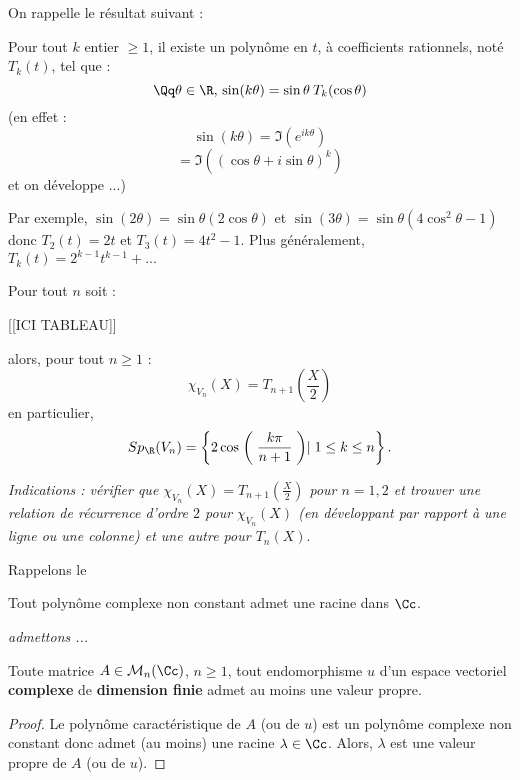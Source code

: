 \documentclass[class=report,crop=false]{standalone}
\newcommand{\Sp}{Sp}
\begin{document}
\begin{exercicecours}
On rappelle le résultat suivant :

Pour tout $k$ entier $\ge 1$, il existe un polynôme en $t$, à coefficients rationnels, noté $T_k(t)$, tel que :
\[\Qq \theta \in \R ,\, \sin (k\theta) = \sin \theta \:  T_k(\cos \theta)\]
(en effet : \[\sin (k\theta) = \Im (e^{ik\theta})\]
\[= \Im \left( (\cos \theta + i \sin \theta )^k \right)\]
et on développe ...)

Par exemple, $\sin (2 \theta) = \sin \theta (2 \cos \theta)$ et $\sin (3 \theta) = \sin \theta (4 \cos^2 \theta -1)$ donc $T_2(t) =2t$ et $T_3(t) = 4t^2-1$. Plus généralement, $T_k(t) = 2^{k-1}t^{k-1} + ...$

Pour tout $n$ soit :


[[ICI TABLEAU]]
%

alors, pour tout $n \ge 1$ :
\[\chi_{V_n}(X) = T_{n+1}(\frac{X}{2})\]
en particulier, \[\Sp_{\R}(V_n) = \left\{2\cos\biggm(\frac{k\pi}{n+1}\biggm) \mid 1 \le k \le n\right\} .\]

{\it Indications : vérifier que $\chi_{V_n}(X) = T_{n+1}(\frac{X}{2})$ pour $n=1,2$ et trouver une relation de récurrence d'ordre $2$ pour  $\chi_{V_n}(X)$ (en développant par rapport à une ligne ou une colonne) et une autre pour $T_{n}(X)$}.
\end{exercicecours}

Rappelons le 
\begin{theoreme}
Tout polynôme complexe non constant admet une racine dans $\Cc$.
\end{theoreme}

{\it admettons ...}

\begin{corollaire}
Toute matrice $A \in \mathcal{M}_n(\Cc)$, $n \ge 1$, tout endomorphisme $u$ d'un espace vectoriel {\bf complexe} de {\bf dimension finie} admet au moins une valeur propre.
\end{corollaire}

\begin{proof}
Le polynôme caractéristique de $A$ (ou de $u$) est un polynôme complexe non constant donc admet (au moins) une racine $\lambda\in \Cc$. Alors, $\lambda$ est une valeur propre de $A$ (ou de $u$).
\end{proof}
\end{document}
